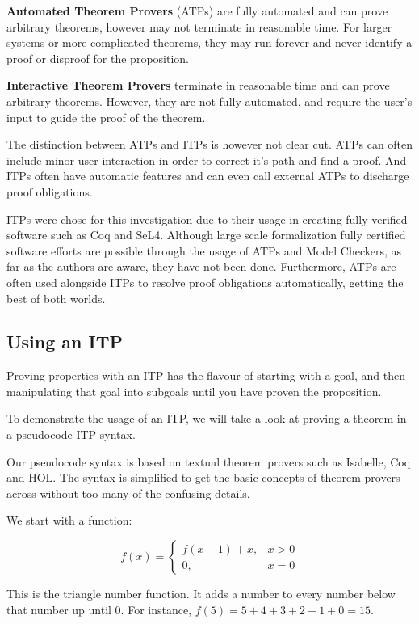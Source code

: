 \documentclass[
]{article}
\begin{document}
\textbf{Automated Theorem Provers} (ATPs) are fully automated and can
prove arbitrary theorems, however may not terminate in reasonable time.
For larger systems or more complicated theorems, they may run forever
and never identify a proof or disproof for the proposition.

\textbf{Interactive Theorem Provers} terminate in reasonable time and
can prove arbitrary theorems. However, they are not fully automated, and
require the user's input to guide the proof of the theorem.

The distinction between ATPs and ITPs is however not clear cut. ATPs can
often include minor user interaction in order to correct it's path and
find a proof. And ITPs often have automatic features and can even call
external ATPs to discharge proof obligations.

ITPs were chose for this investigation due to their usage in creating
fully verified software such as Coq and SeL4. Although large scale
formalization fully certified software efforts are possible through the
usage of ATPs and Model Checkers, as far as the authors are aware, they
have not been done. Furthermore, ATPs are often used alongside ITPs to
resolve proof obligations automatically, getting the best of both
worlds.

\hypertarget{using-an-itp}{%
\subsection{Using an ITP}\label{using-an-itp}}

Proving properties with an ITP has the flavour of starting with a goal,
and then manipulating that goal into subgoals until you have proven the
proposition.

To demonstrate the usage of an ITP, we will take a look at proving a
theorem in a pseudocode ITP syntax.

Our pseudocode syntax is based on textual theorem provers such as
Isabelle, Coq and HOL. The syntax is simplified to get the basic
concepts of theorem provers across without too many of the confusing
details.

We start with a function:

\[
f(x) = 
  \begin{cases}
    f(x - 1) + x, & x > 0 \\
    0, & x = 0
  \end{cases}
\]

This is the triangle number function. It adds a number to every number
below that number up until 0. For instance,
\(f(5) = 5 + 4 + 3 + 2 + 1 + 0 = 15\).
\end{document}
